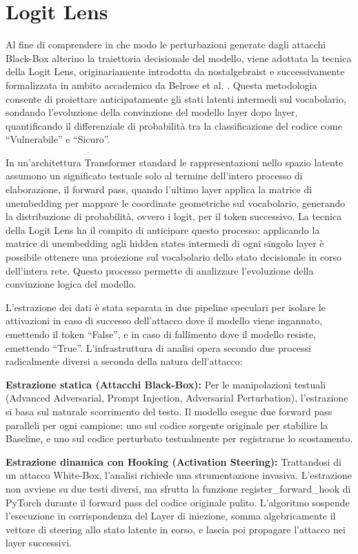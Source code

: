 \section{Logit Lens}
Al fine di comprendere in che modo le perturbazioni generate dagli attacchi Black-Box alterino la traiettoria decisionale del modello, viene adottata la tecnica della Logit Lens, originariamente introdotta da nostalgebraist \cite{nostalgebraist2020logitlens} e successivamente formalizzata in ambito accademico da Belrose et al. \cite{belrose2025elicitinglatentpredictionstransformers}. Questa metodologia consente di proiettare anticipatamente gli stati latenti intermedi sul vocabolario, sondando l'evoluzione della convinzione del modello layer dopo layer, quantificando il differenziale di probabilità tra la classificazione del codice come \enquote{Vulnerabile} e \enquote{Sicuro}.

In un'architettura Transformer standard le rappresentazioni nello spazio latente assumono un significato testuale solo al termine dell'intero processo di elaborazione, il forward pass, quando l'ultimo layer applica la matrice di unembedding per mappare le coordinate geometriche sul vocabolario, generando la distribuzione di probabilità, ovvero i logit, per il token successivo. La tecnica della Logit Lens ha il compito di anticipare questo processo: applicando la matrice di unembedding agli hidden states intermedi di ogni singolo layer è possibile ottenere una proiezione sul vocabolario dello stato decisionale in corso dell'intera rete. Questo processo permette di analizzare l'evoluzione della convinzione logica del modello.

L'estrazione dei dati è stata separata in due pipeline speculari per isolare le attivazioni in caso di successo dell'attacco  dove il modello viene ingannato, emettendo il token \enquote{False}, e in caso di fallimento dove il modello resiste, emettendo \enquote{True}. L'infrastruttura di analisi opera secondo due processi radicalmente diversi a seconda della natura dell'attacco:

\textbf{Estrazione statica (Attacchi Black-Box):} Per le manipolazioni testuali (Advanced Adversarial, Prompt Injection, Adversarial Perturbation), l'estrazione si basa sul naturale scorrimento del testo. Il modello esegue due forward pass paralleli per ogni campione: uno sul codice sorgente originale per stabilire la Baseline, e uno sul codice perturbato testualmente per registrarne lo scostamento.

\textbf{Estrazione dinamica con Hooking (Activation Steering):} Trattandosi di un attacco White-Box, l'analisi richiede una strumentazione invasiva. L'estrazione non avviene su due testi diversi, ma sfrutta la funzione register\_forward\_hook di PyTorch durante il forward pass del codice originale pulito. L'algoritmo sospende l'esecuzione in corrispondenza del Layer di iniezione, somma algebricamente il vettore di steering allo stato latente in corso, e lascia poi propagare l'attacco nei layer successivi. 

